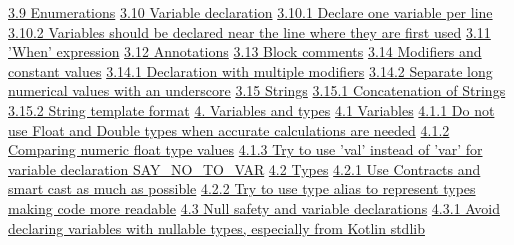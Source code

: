 \hspace{0.5cm}\hyperref[sec:3.9]{ 3.9 Enumerations}
\hspace{0.5cm}\hyperref[sec:3.10]{ 3.10 Variable declaration}
\hspace{1.0cm}\hyperref[sec:3.10.1]{ 3.10.1 Declare one variable per line}
\hspace{1.0cm}\hyperref[sec:3.10.2]{ 3.10.2 Variables should be declared near the line where they are first used}
\hspace{0.5cm}\hyperref[sec:3.11]{ 3.11 'When' expression}
\hspace{0.5cm}\hyperref[sec:3.12]{ 3.12 Annotations}
\hspace{0.5cm}\hyperref[sec:3.13]{ 3.13 Block comments}
\hspace{0.5cm}\hyperref[sec:3.14]{ 3.14 Modifiers and constant values}
\hspace{1.0cm}\hyperref[sec:3.14.1]{ 3.14.1 Declaration with multiple modifiers}
\hspace{1.0cm}\hyperref[sec:3.14.2]{ 3.14.2 Separate long numerical values with an underscore}
\hspace{1.0cm}\hyperref[sec:3.15]{ 3.15 Strings}
\hspace{1.0cm}\hyperref[sec:3.15.1]{ 3.15.1 Concatenation of Strings}
\hspace{1.0cm}\hyperref[sec:3.15.2]{ 3.15.2 String template format}
\hspace{0.0cm}\hyperref[sec:4.]{4. Variables and types}
\hspace{0.5cm}\hyperref[sec:4.1]{ 4.1 Variables}
\hspace{1.0cm}\hyperref[sec:4.1.1]{ 4.1.1 Do not use Float and Double types when accurate calculations are needed}
\hspace{1.0cm}\hyperref[sec:4.1.2]{ 4.1.2 Comparing numeric float type values}
\hspace{1.0cm}\hyperref[sec:4.1.3]{ 4.1.3 Try to use 'val' instead of 'var' for variable declaration SAY\_NO\_TO\_VAR}
\hspace{0.5cm}\hyperref[sec:4.2]{ 4.2 Types}
\hspace{1.0cm}\hyperref[sec:4.2.1]{ 4.2.1 Use Contracts and smart cast as much as possible}
\hspace{1.0cm}\hyperref[sec:4.2.2]{ 4.2.2 Try to use type alias to represent types making code more readable}
\hspace{0.5cm}\hyperref[sec:4.3]{ 4.3 Null safety and variable declarations}
\hspace{1.0cm}\hyperref[sec:4.3.1]{ 4.3.1 Avoid declaring variables with nullable types, especially from Kotlin stdlib}
